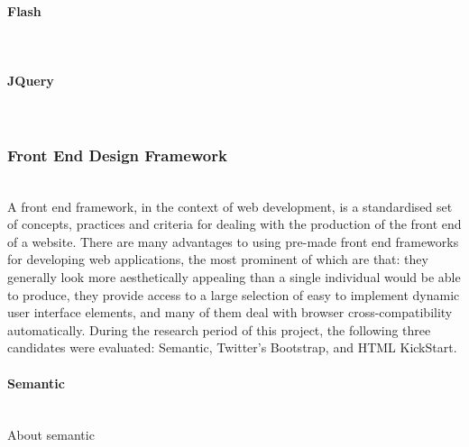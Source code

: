 \paragraph{Flash}\ \\

\paragraph{JQuery}\ \\

\subsubsection{Front End Design Framework}\ \\
A front end framework, in the context of web development, is a standardised set of concepts, practices and criteria for dealing with the production of the front end of a website. There are many advantages to using pre-made front end frameworks for developing web applications, the most prominent of which are that: they generally look more aesthetically appealing than a single individual would be able to produce, they provide access to a large selection of easy to implement dynamic user interface elements, and many of them deal with browser cross-compatibility automatically. During the research period of this project, the following three candidates were evaluated: Semantic, Twitter's Bootstrap, and HTML KickStart.

\paragraph{Semantic}\ \\
{\color{red} About semantic }

